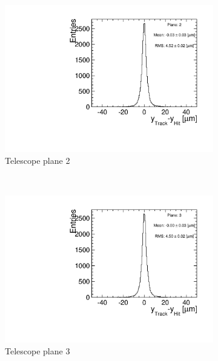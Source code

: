 \begin{figure}[htbp]
\begin{subfigure}[b]{0.3\textwidth}
    \includegraphics[width=\textwidth]{figures/Telescope/biasedResiduals/BiasedResiduals_run49_PlaneYRMS2.pdf}
    \caption{Telescope plane 2}
  \end{subfigure} \\
  \begin{subfigure}[b]{0.3\textwidth}
    \includegraphics[width=\textwidth]{figures/Telescope/biasedResiduals/BiasedResiduals_run49_PlaneYRMS3.pdf}
    \caption{Telescope plane 3}
  \end{subfigure}\hfill
  \begin{subfigure}[b]{0.3\textwidth}

\end{subfigure}
\end{figure}
